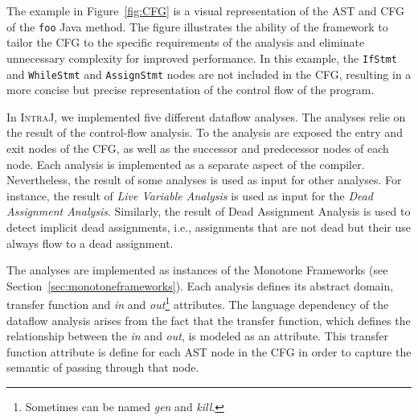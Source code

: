 The example in Figure~\ref{fig:CFG} is a visual representation of the AST and CFG of the 
\texttt{foo} Java method. The figure illustrates the ability of the framework to tailor the CFG
to the specific requirements of the analysis and eliminate unnecessary complexity for improved performance.
In this example, the \texttt{IfStmt} and \texttt{WhileStmt} and \texttt{AssignStmt} nodes are not included in the CFG,
resulting in a more concise but precise representation of the control flow of the program.


In \textsc{IntraJ}, we implemented five different dataflow analyses. The analyses 
relie on the result of the control-flow analysis. To the analysis are exposed 
the entry and exit nodes of the CFG, as well as the successor and predecessor
nodes of each node. 
Each analysis is implemented as a separate aspect of the compiler. Nevertheless,
the result of some analyses is used as input for other analyses. For instance,
the result of \emph{Live Variable Analysis} is used as input for the \emph{Dead Assignment Analysis}.
Similarly, the result of Dead Assignment Analysis is used to detect implicit dead assignments, i.e.,
assignments that are not dead but their use always flow to a dead assignment.

The analyses are implemented as instances of the Monotone Frameworks (see Section~\ref{sec:monotoneframeworks}).
Each analysis defines its abstract domain, transfer function and \emph{in} and 
\emph{out}\footnote{Sometimes can be named \emph{gen} and \emph{kill}.} attributes.
The language dependency of the dataflow analysis arises from the fact that the
transfer function, which defines the relationship between the \emph{in} and \emph{out},
is modeled as an attribute. This transfer function attribute is 
define for each AST node in the CFG in order to capture the semantic of passing 
through that node.


















